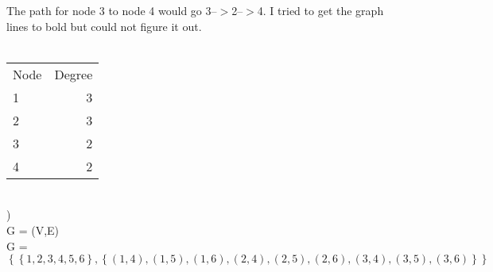 \documentclass{article}
\begin{document}
\noindent The path for node 3 to node 4 would go 3--$>$2--$>$4.  I tried to get the graph lines to bold but could not figure it out. \\ \\

\begin{tabular}{l | r}
Node & Degree \\
1 & 3 \\
2 & 3 \\
3 & 2 \\
4 & 2
\end{tabular} \\

) \\
G = (V,E)\\
G = $\left\{\left\{1,2,3,4,5,6\right\}, \left\{(1,4), (1,5), (1,6), (2,4), (2,5), (2,6), (3,4), (3,5), (3,6)\right\}\right\}$
\end{document}
